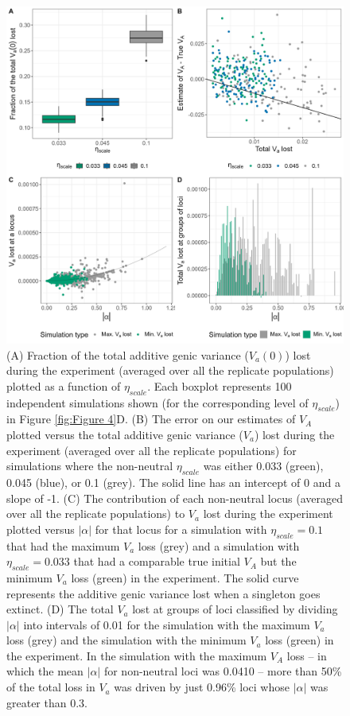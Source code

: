 \documentclass[12pt]{article}
\begin{document}
\begin{bibunit}
\begin{figure}[p]
\begin{center}
\includegraphics[scale = 0.11]{Figures/FigS2.jpg}
\end{center}
\caption{(A) Fraction of the total additive genic variance ($V_a(0)$) lost during the experiment (averaged over all the replicate populations) plotted as a function of $\eta_{scale}$. Each boxplot represents 100 independent simulations shown (for the corresponding level of $\eta_{scale}$) in Figure \ref{fig:Figure 4}D. (B) The error on our estimates of $V_A$ plotted versus the total additive genic variance ($V_a$) lost during the experiment (averaged over all the replicate populations) for simulations where the non-neutral $\eta_{scale}$ was either 0.033 (green), 0.045 (blue), or 0.1 (grey). The solid line has an intercept of 0 and a slope of -1. (C) The contribution of each non-neutral locus (averaged over all the replicate populations) to $V_a$ lost during the experiment plotted versus $|\alpha|$ for that locus for a simulation with $\eta_{scale} = 0.1$ that had the maximum $V_a$ loss (grey) and a simulation with $\eta_{scale} = 0.033$ that had a comparable true initial $V_A$ but  the minimum $V_a$ loss (green) in the experiment. The solid curve represents the additive genic variance lost when a singleton goes extinct. (D) The total $V_a$ lost at groups of loci classified by dividing $|\alpha|$ into intervals of 0.01 for the simulation with the maximum $V_a$ loss (grey) and the simulation with the minimum $V_a$ loss (green) in the experiment. In the simulation with the maximum $V_A$ loss -- in which the mean $|\alpha|$ for non-neutral loci was 0.0410 -- more than 50\% of the total loss in $V_a$ was driven by just 0.96\% loci whose $|\alpha|$ was greater than 0.3.}
  \label{fig:Figure S2}
\end{figure}


\end{bibunit}
\end{document}
